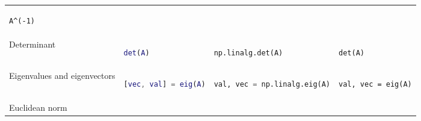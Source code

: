 \documentclass[10pt, landscape]{article}
\begin{document}
\begin{multicols}{2}
\begin{tabular}[]{@{}llll@{}}
\begin{minipage}[t]{0.20\columnwidth}
\begin{lstlisting}
A^(-1)
\end{lstlisting}
\strut
\end{minipage}\tabularnewline
\begin{minipage}[t]{0.23\columnwidth}\raggedright\strut
Determinant\strut
\end{minipage} & \begin{minipage}[t]{0.22\columnwidth}\raggedright\strut
\begin{lstlisting}[language=Matlab]
det(A)
\end{lstlisting}
\strut
\end{minipage} & \begin{minipage}[t]{0.23\columnwidth}\raggedright\strut
\begin{lstlisting}[language=Python]
np.linalg.det(A)
\end{lstlisting}
\strut
\end{minipage} & \begin{minipage}[t]{0.20\columnwidth}\raggedright\strut
\begin{lstlisting}
det(A)
\end{lstlisting}
\strut
\end{minipage}\tabularnewline
\begin{minipage}[t]{0.23\columnwidth}\raggedright\strut
Eigenvalues and eigenvectors\strut
\end{minipage} & \begin{minipage}[t]{0.22\columnwidth}\raggedright\strut
\begin{lstlisting}[language=Matlab]
[vec, val] = eig(A)
\end{lstlisting}
\strut
\end{minipage} & \begin{minipage}[t]{0.23\columnwidth}\raggedright\strut
\begin{lstlisting}[language=Python]
val, vec = np.linalg.eig(A)
\end{lstlisting}
\strut
\end{minipage} & \begin{minipage}[t]{0.20\columnwidth}\raggedright\strut
\begin{lstlisting}
val, vec = eig(A)
\end{lstlisting}
\strut
\end{minipage}\tabularnewline
\begin{minipage}[t]{0.23\columnwidth}\raggedright\strut
Euclidean norm\strut
\end{minipage} & \begin{minipage}[t]{0.22\columnwidth}\raggedright\strut

\end{minipage}
\end{tabular}
\end{multicols}
\end{document}
